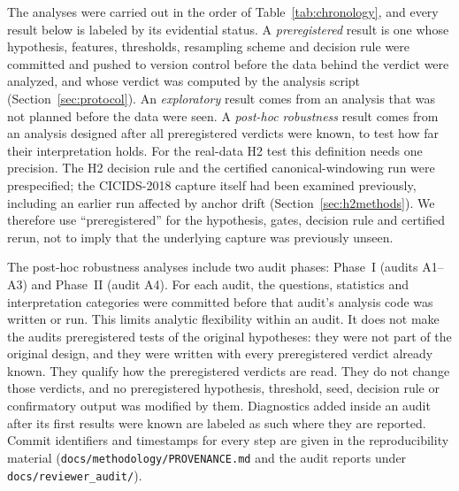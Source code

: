 \documentclass[preprint,12pt]{elsarticle}
\begin{document}
The analyses were carried out in the order of Table~\ref{tab:chronology}, and every result below is labeled by its evidential status. A \emph{preregistered} result is one whose hypothesis, features, thresholds, resampling scheme and decision rule were committed and pushed to version control before the data behind the verdict were analyzed, and whose verdict was computed by the analysis script (Section~\ref{sec:protocol}). An \emph{exploratory} result comes from an analysis that was not planned before the data were seen. A \emph{post-hoc robustness} result comes from an analysis designed after all preregistered verdicts were known, to test how far their interpretation holds. For the real-data H2 test this definition needs one precision. The H2 decision rule and the certified canonical-windowing run were prespecified; the CICIDS-2018 capture itself had been examined previously, including an earlier run affected by anchor drift (Section~\ref{sec:h2methods}). We therefore use ``preregistered'' for the hypothesis, gates, decision rule and certified rerun, not to imply that the underlying capture was previously unseen.

The post-hoc robustness analyses include two audit phases: Phase~I (audits A1--A3) and Phase~II (audit A4). For each audit, the questions, statistics and interpretation categories were committed before that audit's analysis code was written or run. This limits analytic flexibility within an audit. It does not make the audits preregistered tests of the original hypotheses: they were not part of the original design, and they were written with every preregistered verdict already known. They qualify how the preregistered verdicts are read. They do not change those verdicts, and no preregistered hypothesis, threshold, seed, decision rule or confirmatory output was modified by them. Diagnostics added inside an audit after its first results were known are labeled as such where they are reported. Commit identifiers and timestamps for every step are given in the reproducibility material (\texttt{docs/methodology/PROVENANCE.md} and the audit reports under \texttt{docs/reviewer\_audit/}).
\end{document}
